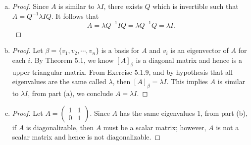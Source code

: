 \begin{Exercise}
	\begin{enumerate}[(a)]
		\item
		\begin{proof}
			Since $A$ is similar to $\lambda I$, there exists $Q$ which is invertible such that $A = Q^{-1} \lambda I Q$. It follows that
			$$
			A = \lambda Q^{-1} I Q = \lambda Q^{-1} Q = \lambda I.
			$$
		\end{proof}
		
		\item
		\begin{proof}
			Let $\beta = \{v_1,v_2,\cdots,v_n\}$ is a basis for $A$ and $v_i$ is an eigenvector of $A$ for each $i$. By Theorem 5.1, we know $[A]_{\beta}$ is a diagonal matrix and hence is a upper triangular matrix. From Exercise 5.1.9, and by hypothesis that all eigenvalues are the same called $\lambda$, then $[A]_{\beta} = \lambda I$. This implies $A$ is similar to $\lambda I$, from part (a), we conclude $A = \lambda I$.
		\end{proof}
		
		\item
		\begin{proof}
			Let $A = \begin{pmatrix}
			1 & 1 \\
			0 & 1
			\end{pmatrix}$. Since $A$ has the same eigenvalues $1$, from part (b), if $A$ is diagonalizable, then $A$ must be a scalar matrix; however, $A$ is not a scalar matrix and hence is not diagonalizable. 
		\end{proof}
	\end{enumerate}
\end{Exercise}